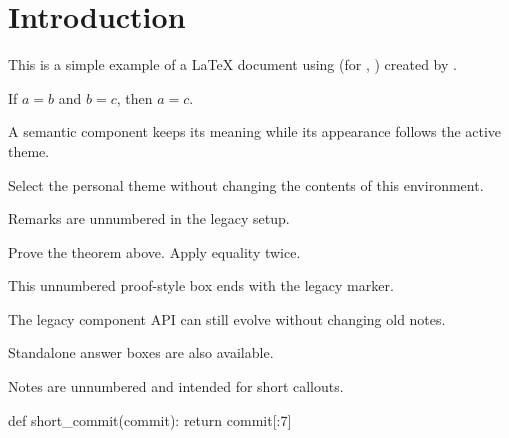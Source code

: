 \documentclass[a4paper]{report}
\begin{document}
    \MakeProjectFrontPage

    \section{Introduction}
    This is a simple example of a LaTeX document using \ProjectTitle (for \ProjectCourseCode, \ProjectCourseName) created by \ProjectAuthor.

    \begin{theorem}
        If $a=b$ and $b=c$, then $a=c$.
    \end{theorem}

    \begin{definition}
        A semantic component keeps its meaning while its appearance follows the active theme.
    \end{definition}

    \begin{example}
        Select the personal theme without changing the contents of this environment.
    \end{example}

    \begin{remark}
        Remarks are unnumbered in the legacy setup.
    \end{remark}

    \begin{exercise}[Short][Transitivity]
        Prove the theorem above.
        \Answer
        Apply equality twice.
    \end{exercise}

    \begin{explanation}
        This unnumbered proof-style box ends with the legacy marker.
    \end{explanation}

    \begin{conjecture}
        The legacy component API can still evolve without changing old notes.
    \end{conjecture}

    \begin{answer}
        Standalone answer boxes are also available.
    \end{answer}

    \begin{note}
        Notes are unnumbered and intended for short callouts.
    \end{note}

    \begin{code}[language=Python]
def short_commit(commit):
    return commit[:7]
    \end{code}
\end{document}

